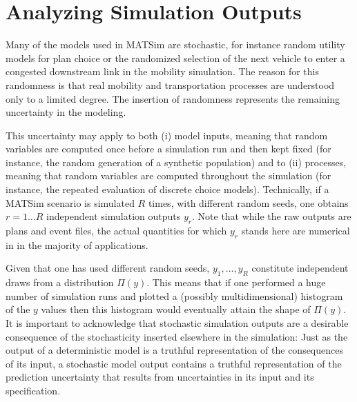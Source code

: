 \section{\label{sec:Statistical-analysis-of}Analyzing Simulation Outputs}


Many of the models used in MATSim are stochastic, for instance random
utility models for plan choice or the randomized selection of the
next vehicle to enter a congested downstream link in the mobility
simulation. The reason for this randomness is that real mobility and
transportation processes are understood only to a limited degree.
The insertion of randomness represents the remaining uncertainty in
the modeling. 

This uncertainty may apply to both (i) model inputs, meaning that
random variables are computed once before a simulation run and then
kept fixed (for instance, the random generation of a synthetic population)
and to (ii) processes, meaning that random variables are computed
throughout the simulation (for instance, the repeated evaluation of
discrete choice models). Technically, if a MATSim scenario is simulated
$R$ times, with different random seeds, one obtains $r=1\ldots R$
independent simulation outputs $y_{r}$. Note that while the raw outputs
are plans and event files, the actual quantities for which $y_{r}$
stands here are numerical in in the majority of applications.

Given that one has used different random seeds, $y_{1},\ldots,y_{R}$
constitute independent draws from a distribution $\Pi(y)$. This means
that if one performed a huge number of simulation runs and plotted
a (possibly multidimensional) histogram of the $y$ values then this
histogram would eventually attain the shape of $\Pi(y)$. It is important
to acknowledge that stochastic simulation outputs are a desirable
consequence of the stochasticity inserted elsewhere in the simulation:
Just as the output of a deterministic model is a truthful representation
of the consequences of its input, a stochastic model output contains
a truthful representation of the prediction uncertainty that results
from uncertainties in its input and its specification.

